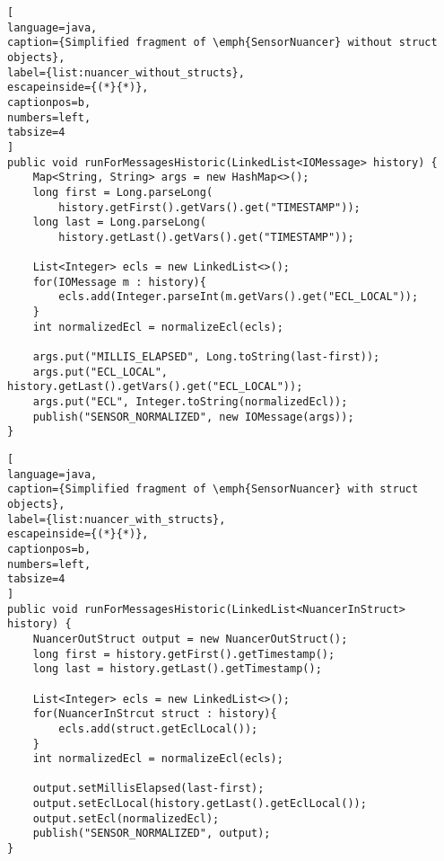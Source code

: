 \begin{scriptsize}
\begin{minipage}{\textwidth}
\begin{lstlisting}[
language=java, 
caption={Simplified fragment of \emph{SensorNuancer} without struct objects}, 
label={list:nuancer_without_structs}, 
escapeinside={(*}{*)}, 
captionpos=b,
numbers=left,
tabsize=4
]
public void runForMessagesHistoric(LinkedList<IOMessage> history) {
	Map<String, String> args = new HashMap<>();
	long first = Long.parseLong(
		history.getFirst().getVars().get("TIMESTAMP"));
	long last = Long.parseLong(
		history.getLast().getVars().get("TIMESTAMP"));
			
	List<Integer> ecls = new LinkedList<>();
	for(IOMessage m : history){
		ecls.add(Integer.parseInt(m.getVars().get("ECL_LOCAL"));		
	}
	int normalizedEcl = normalizeEcl(ecls);
			
	args.put("MILLIS_ELAPSED", Long.toString(last-first));
	args.put("ECL_LOCAL", history.getLast().getVars().get("ECL_LOCAL"));
	args.put("ECL", Integer.toString(normalizedEcl));
	publish("SENSOR_NORMALIZED", new IOMessage(args));		
}
\end{lstlisting}
\end{minipage}
\end{scriptsize}
\begin{scriptsize}
\begin{minipage}{\textwidth}
\begin{lstlisting}[
language=java, 
caption={Simplified fragment of \emph{SensorNuancer} with struct objects}, 
label={list:nuancer_with_structs}, 
escapeinside={(*}{*)}, 
captionpos=b,
numbers=left,
tabsize=4
]	
public void runForMessagesHistoric(LinkedList<NuancerInStruct> history) {
	NuancerOutStruct output = new NuancerOutStruct();
	long first = history.getFirst().getTimestamp();
	long last = history.getLast().getTimestamp();
			
	List<Integer> ecls = new LinkedList<>();
	for(NuancerInStrcut struct : history){
		ecls.add(struct.getEclLocal());
	}
	int normalizedEcl = normalizeEcl(ecls);		
			
	output.setMillisElapsed(last-first);
	output.setEclLocal(history.getLast().getEclLocal());
	output.setEcl(normalizedEcl);				
	publish("SENSOR_NORMALIZED", output);	
}
\end{lstlisting}
\end{minipage}
\end{scriptsize}